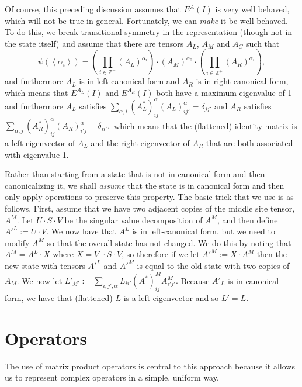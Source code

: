 \documentclass{article}
\newcommand{\paren}[1]{\left(#1\right)}
\newcommand{\seq}[1]{\left<#1\right>}
\newcommand{\Z}{\mathbb{Z}}
\begin{document}
Of course, this preceding discussion assumes that $E^A(I)$ is very well behaved, which will not be true in general.  Fortunately, we can \emph{make} it be well behaved.  To do this, we break transitional symmetry in the representation (though not in the state itself) and assume that there are tensors $A_L$, $A_M$ and $A_C$ such that \begin{equation}
\label{eq:newform}
\psi(\seq{\alpha_i}) = \paren{\prod_{i\in\Z^-}(A_L)^{\alpha_i}}\cdot (A_M)^{\alpha_0}\cdot \paren{\prod_{i\in\Z^+}(A_R)^{\alpha_i}},\end{equation}
and furthermore $A_L$ is in left-canonical form and $A_R$ is in right-canonical form, which means that $E^{A_L}(I)$ and $E^{A_R}(I)$ both have a maximum eigenvalue of 1 and furthermore $A_L$ satisfies $\sum_{\alpha,i}(A_L^*)^{\alpha}_{ij}(A_L)^{\alpha}_{ij'}=\delta_{jj'}$ and $A_R$ satisfies $\sum_{\alpha,j}(A_R^*)^{\alpha}_{ij}(A_R)^{\alpha}_{i'j}=\delta_{ii'},$  which means that the (flattened) identity matrix is a left-eigenvector of $A_L$ and the right-eigenvector of $A_R$ that are both associated with eigenvalue 1.

Rather than starting from a state that is not in canonical form and then canonicalizing it, we shall \emph{assume} that the state is in canonical form and then only apply operations to preserve this property.  The basic trick that we use is as follows.  First, assume that we have two adjacent copies of the middle site tensor, $A^M$.  Let $U\cdot S\cdot V$ be the singular value decomposition of $A^M$, and then define $A'^L:=U\cdot V$.  We now have that $A^L$ is in left-canonical form, but we need to modify $A^M$ so that the overall state has not changed.  We do this by noting that $A^M=A^L\cdot X$ where $X=V^\dagger\cdot S\cdot V$, so therefore if we let $A'^M:= X\cdot A^M$ then the new state with tensors $A'^L$ and $A'^M$ is equal to the old state with two copies of $A_M$.  We now let $L'_{jj'}:=\sum_{i,j',\alpha}L_{ii'}(A^*)^M_{ij} A^M_{i'j'}.$  Because $A'_L$ is in canonical form, we have that (flattened) $L$ is a left-eigenvector and so $L'=L$.

\section{Operators}

The use of matrix product operators is central to this approach because it allows us to represent complex operators in a simple, uniform way.
\end{document}
